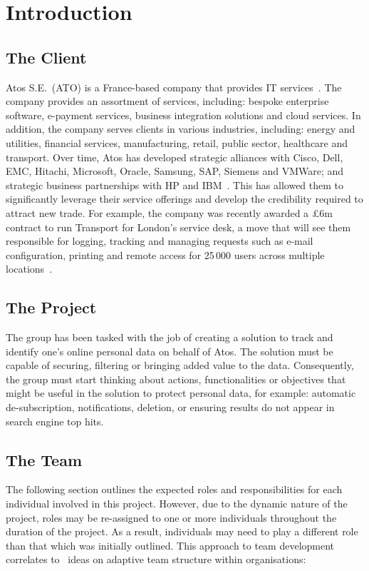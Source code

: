 \section{Introduction}

\subsection{The Client}

Atos S.E.~(ATO) is a France-based company that provides IT services~\parencite{web:reuters}. The company provides an assortment of services, including: bespoke enterprise software, e-payment services, business integration solutions and cloud services. In addition, the company serves clients in various industries, including: energy and utilities, financial services, manufacturing, retail, public sector, healthcare and transport. Over time, Atos has developed strategic alliances with Cisco, Dell, EMC, Hitachi, Microsoft, Oracle, Samsung, SAP, Siemens and VMWare; and strategic business partnerships with HP and IBM~\parencite{web:bloomberg}. This has allowed them to significantly leverage their service offerings and develop the credibility required to attract new trade. For example, the company was recently awarded a \pounds 6m contract to run Transport for London's service desk, a move that will see them responsible for logging, tracking and managing requests such as e-mail configuration, printing and remote access for 25\,000 users across multiple locations~\parencite{web:jee}.

\subsection{The Project}

The group has been tasked with the job of creating a solution to track and identify one’s online personal data on behalf of Atos. The solution must be capable of securing, filtering or bringing added value to the data. Consequently, the group must start thinking about actions, functionalities or objectives that might be useful in the solution to protect personal data, for example: automatic de-subscription, notifications, deletion, or ensuring results do not appear in search engine top hits.

\subsection{The Team}

The following section outlines the expected roles and responsibilities for each individual involved in this project. However, due to the dynamic nature of the project, roles may be re-assigned to one or more individuals throughout the duration of the project. As a result, individuals may need to play a different role than that which was initially outlined. This approach to team development correlates to~\textcite{book:xteams} ideas on adaptive team structure within organisations:

